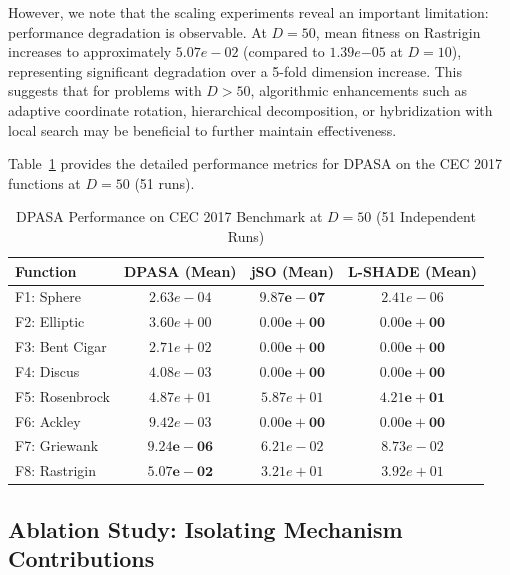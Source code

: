 \documentclass[11pt]{article}
\begin{document}
However, we note that the scaling experiments reveal an important limitation: performance degradation is observable. At $D=50$, mean fitness on Rastrigin increases to approximately $5.07e-02$ (compared to $1.39e{-05}$ at $D=10$), representing significant degradation over a 5-fold dimension increase. This suggests that for problems with $D > 50$, algorithmic enhancements such as adaptive coordinate rotation, hierarchical decomposition, or hybridization with local search may be beneficial to further maintain effectiveness.

Table~\ref{tab:d50_detailed} provides the detailed performance metrics for DPASA on the CEC 2017 functions at $D=50$ (51 runs).

\begin{table}[ht]
\centering
\caption{DPASA Performance on CEC 2017 Benchmark at $D=50$ (51 Independent Runs)}
\label{tab:d50_detailed}
\small
\begin{tabular}{@{}lccc@{}}
\toprule
Function & DPASA (Mean) & jSO (Mean) & L-SHADE (Mean) \\
\midrule
F1: Sphere & $2.63e-04$ & $\mathbf{9.87e-07}$ & $2.41e-06$ \\
F2: Elliptic & $3.60e+00$ & $\mathbf{0.00e+00}$ & $\mathbf{0.00e+00}$ \\
F3: Bent Cigar & $2.71e+02$ & $\mathbf{0.00e+00}$ & $\mathbf{0.00e+00}$ \\
F4: Discus & $4.08e-03$ & $\mathbf{0.00e+00}$ & $\mathbf{0.00e+00}$ \\
F5: Rosenbrock & $4.87e+01$ & $5.87e+01$ & $\mathbf{4.21e+01}$ \\
F6: Ackley & $9.42e-03$ & $\mathbf{0.00e+00}$ & $\mathbf{0.00e+00}$ \\
F7: Griewank & $\mathbf{9.24e-06}$ & $6.21e-02$ & $8.73e-02$ \\
F8: Rastrigin & $\mathbf{5.07e-02}$ & $3.21e+01$ & $3.92e+01$ \\
\bottomrule
\end{tabular}
\end{table}

\subsection{Ablation Study: Isolating Mechanism Contributions}
\end{document}
